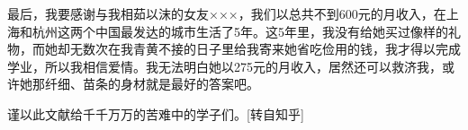 \documentclass[a4paper,zihao=-4,UTF8]{ctexart}
\numberwithin{equation}{section}
\begin{document}
最后，我要感谢与我相茹以沫的女友×××，我们以总共不到600元的月收入，在上海和杭州这两个中国最发达的城市生活了5年。这5年里，我没有给她买过像样的礼物，而她却无数次在我青黄不接的日子里给我寄来她省吃俭用的钱，我才得以完成学业，所以我相信爱情。我无法明白她以275元的月收入，居然还可以救济我，或许她那纤细、苗条的身材就是最好的答案吧。

谨以此文献给千千万万的苦难中的学子们。[转自知乎]
\end{document}
